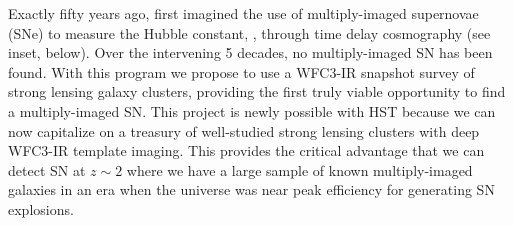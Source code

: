 %


Exactly fifty years ago, \citet{Refsdal:1964} first imagined the use
of multiply-imaged supernovae (SNe) to measure the Hubble
constant, \Ho, through time delay cosmography (see inset, below).
Over the intervening 5 decades, no multiply-imaged SN has been found.
With this program we propose to use a WFC3-IR snapshot survey of
strong lensing galaxy clusters, providing the first truly viable
opportunity to find a multiply-imaged SN.  This project is newly
possible with HST because we can now capitalize on a treasury
of well-studied strong lensing clusters with deep WFC3-IR template
imaging.  This provides the critical advantage that we can detect SN
at $z\sim2$ where we have a large sample of known multiply-imaged
galaxies in an era when the universe was near peak efficiency for
generating SN explosions.

\bigskip

